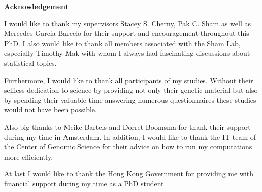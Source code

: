 \documentclass[header.tex]{subfiles}
\begin{document}
\begin{center}
  {\textbf{Acknowledgement}}
\end{center}

I would like to thank my supervisors Stacey S. Cherny, Pak C. Sham as well as Mercedes Garcia-Barcelo for their support and encouragement throughout this PhD\@.
I also would like to thank all members associated with the Sham Lab, especially Timothy Mak with whom I always had fascinating discussions about statistical topics.

Furthermore, I would like to thank all participants of my studies.
Without their selfless dedication to science by providing not only their genetic material but also by spending their valuable time answering numerous questionnaires these studies would not have been possible.

Also big thanks to Meike Bartels and Dorret Boomsma for thank their support during my time in Amsterdam.
In addition, I would like to thank the IT team of the Center of Genomic Science for their advice on how to run my computations more efficiently.  

At last I would like to thank the Hong Kong Government for providing me with financial support during my time as a PhD student. 
\end{document}
